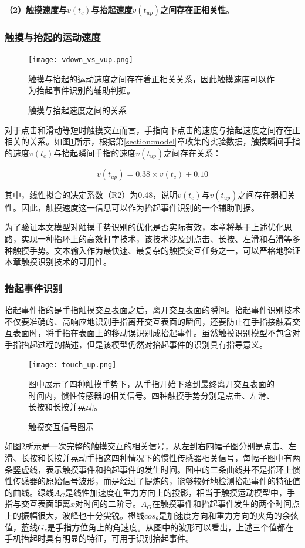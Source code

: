 \textbf{（2）触摸速度与$v(t_c)$与抬起速度$v(t_{up})$之间存在正相关性}。

\subsubsection{触摸与抬起的运动速度}

\begin{figure}
	\centering
	\texttt{[image: vdown\_vs\_vup.png]}
	\caption*{触摸与抬起的运动速度之间存在着正相关关系，因此触摸速度可以作为抬起事件识别的辅助判据。}
	\caption{触摸与抬起速度之间的关系}
	\label{fig:vdown_vs_vup}
\end{figure}

对于点击和滑动等短时触摸交互而言，手指向下点击的速度与抬起速度之间存在正相关的关系。如图\ref{fig:vdown_vs_vup}所示，根据第\ref{section:model}章收集的实验数据，触摸瞬间手指的速度$v(t_c)$与抬起瞬间手指的速度$v(t_{up})$之间存在关系：

\begin{equation}
	v(t_{up})=0.38\times v(t_c)+0.10
\end{equation}

其中，线性拟合的决定系数（R2）为0.48，说明$v(t_c)$与$v(t_{up})$之间存在弱相关性。因此，触摸速度这一信息可以作为抬起事件识别的一个辅助判据。

为了验证本文模型对触摸手势识别的优化是否实际有效，本章将基于上述优化思路，实现一种指环上的高效打字技术，该技术涉及到点击、长按、左滑和右滑等多种触摸手势。文本输入作为最快速、最复杂的触摸交互任务之一，可以严格地验证本章触摸识别技术的可用性。

\subsubsection{抬起事件识别}

抬起事件指的是手指触摸交互表面之后，离开交互表面的瞬间。抬起事件识别技术不仅要准确的、高响应地识别手指离开交互表面的瞬间，还要防止在手指接触着交互表面时，将手指在表面上的移动误识别成抬起事件。虽然触摸识别模型不包含对手指抬起过程的描述，但是该模型仍然对抬起事件的识别具有指导意义。

\begin{figure}
	\centering
	\texttt{[image: touch\_up.png]}
	\caption*{图中展示了四种触摸手势下，从手指开始下落到最终离开交互表面的时间内，惯性传感器的相关信号。四种触摸手势分别是点击、左滑、长按和长按并晃动。}
	\caption{触摸交互信号图示}
	\label{fig:touch_up}
\end{figure}

如图\ref{fig:touch_up}所示是一次完整的触摸交互的相关信号，从左到右四幅子图分别是点击、左滑、长按和长按并晃动手指这四种情况下的惯性传感器相关信号，每幅子图中有两条竖虚线，表示触摸事件和抬起事件的发生时间。图中的三条曲线并不是指环上惯性传感器的原始信号波形，而是经过了提炼的，能够较好地检测抬起事件的特征值的曲线。绿线$A_G$是线性加速度在重力方向上的投影，相当于触摸运动模型中，手指与交互表面距离$x$对时间的二阶导。$A_G$在触摸事件和抬起事件发生的两个时间点上的振幅很大，波峰也十分尖锐。橙线$cos_\theta$是加速度方向和重力方向的夹角的余弦值，蓝线$G_z$是手指方位角上的角速度。从图中的波形可以看出，上述三个值都在手机抬起时具有明显的特征，可用于识别抬起事件。

